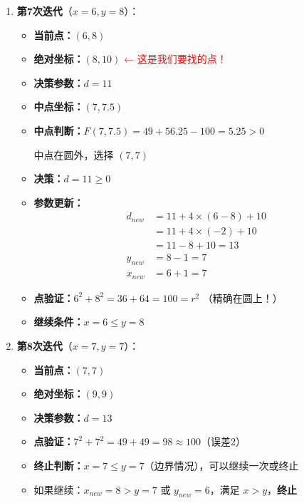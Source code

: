 ﻿\documentclass[12pt,a4paper]{article}
\begin{document}
\begin{enumerate}
\begin{itemize}
    中点在圆外，选择 $(6, 8)$
  \item \textbf{决策：}$d = 17 \geq 0$
  \item \textbf{参数更新：}
    \begin{align*}
    d_{new} &= 17 + 4 \times (5-9) + 10 \\
    &= 17 + 4 \times (-4) + 10 \\
    &= 17 - 16 + 10 = 11 \\
    y_{new} &= 9 - 1 = 8 \\
    x_{new} &= 5 + 1 = 6
    \end{align*}
  \item \textbf{点验证：}$5^2 + 9^2 = 25 + 81 = 106 \neq 100$（误差6）
  \item \textbf{继续条件：}$x = 5 \leq y = 9$ \checkmark
  \end{itemize}

\item \textbf{第7次迭代}（$x=6, y=8$）：
  \begin{itemize}
  \item \textbf{当前点：}$(6, 8)$
  \item \textbf{绝对坐标：}$(8, 10)$ \quad \textcolor{red}{← 这是我们要找的点！}
  \item \textbf{决策参数：}$d = 11$
  \item \textbf{中点坐标：}$(7, 7.5)$
  \item \textbf{中点判断：}$F(7, 7.5) = 49 + 56.25 - 100 = 5.25 > 0$
    
    中点在圆外，选择 $(7, 7)$
  \item \textbf{决策：}$d = 11 \geq 0$
  \item \textbf{参数更新：}
    \begin{align*}
    d_{new} &= 11 + 4 \times (6-8) + 10 \\
    &= 11 + 4 \times (-2) + 10 \\
    &= 11 - 8 + 10 = 13 \\
    y_{new} &= 8 - 1 = 7 \\
    x_{new} &= 6 + 1 = 7
    \end{align*}
  \item \textbf{点验证：}$6^2 + 8^2 = 36 + 64 = 100 = r^2$ \checkmark（精确在圆上！）
  \item \textbf{继续条件：}$x = 6 \leq y = 8$ \checkmark
  \end{itemize}

\item \textbf{第8次迭代}（$x=7, y=7$）：
  \begin{itemize}
  \item \textbf{当前点：}$(7, 7)$
  \item \textbf{绝对坐标：}$(9, 9)$
  \item \textbf{决策参数：}$d = 13$
  \item \textbf{点验证：}$7^2 + 7^2 = 49 + 49 = 98 \approx 100$（误差2）
  \item \textbf{终止判断：}$x = 7 \leq y = 7$（边界情况），可以继续一次或终止
  \item 如果继续：$x_{new} = 8 > y = 7$ 或 $y_{new} = 6$，满足 $x > y$，\textbf{终止}
  \end{itemize}
\end{enumerate}
\end{document}
